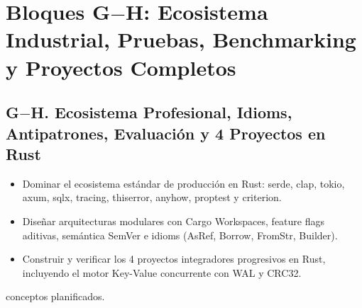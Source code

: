 \documentclass{book}
\begin{document}
\section*{Bloques G\(-\)H: Ecosistema Industrial, Pruebas, Benchmarking y Proyectos Completos}

\subsection*{\checkmark G\(-\)H. Ecosistema Profesional, Idioms, Antipatrones, Evaluación y 4 Proyectos en Rust}
\begin{itemize}
\item Dominar el ecosistema estándar de producción en Rust: serde, clap, tokio, axum, sqlx, tracing, thiserror, anyhow, proptest y criterion.
\item Diseñar arquitecturas modulares con Cargo Workspaces, feature flags aditivas, semántica SemVer e idioms (AsRef, Borrow, FromStr, Builder).
\item Construir y verificar los 4 proyectos integradores progresivos en Rust, incluyendo el motor Key-Value concurrente con WAL y CRC32.
\end{itemize}
 conceptos planificados.
\backmatter
\end{document}
